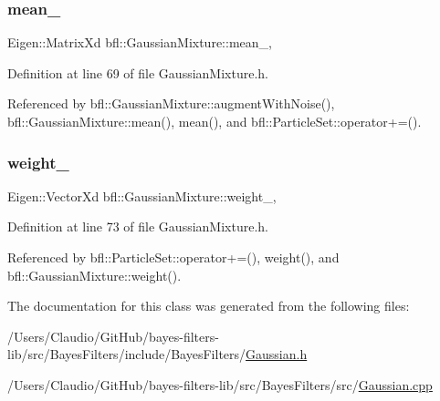 \subsubsection{\texorpdfstring{mean\+\_\+}{mean\_}}
{\footnotesize\ttfamily Eigen\+::\+Matrix\+Xd bfl\+::\+Gaussian\+Mixture\+::mean\+\_\+\hspace{0.3cm}{\ttfamily [protected]}, {\ttfamily [inherited]}}



Definition at line 69 of file Gaussian\+Mixture.\+h.



Referenced by bfl\+::\+Gaussian\+Mixture\+::augment\+With\+Noise(), bfl\+::\+Gaussian\+Mixture\+::mean(), mean(), and bfl\+::\+Particle\+Set\+::operator+=().

\mbox{\label{classbfl_1_1GaussianMixture_ac9ce000575d6b29ad8e1a756d750faff}} 
\subsubsection{\texorpdfstring{weight\+\_\+}{weight\_}}
{\footnotesize\ttfamily Eigen\+::\+Vector\+Xd bfl\+::\+Gaussian\+Mixture\+::weight\+\_\+\hspace{0.3cm}{\ttfamily [protected]}, {\ttfamily [inherited]}}



Definition at line 73 of file Gaussian\+Mixture.\+h.



Referenced by bfl\+::\+Particle\+Set\+::operator+=(), weight(), and bfl\+::\+Gaussian\+Mixture\+::weight().



The documentation for this class was generated from the following files\+:\begin{DoxyCompactItemize}
\item 
/\+Users/\+Claudio/\+Git\+Hub/bayes-\/filters-\/lib/src/\+Bayes\+Filters/include/\+Bayes\+Filters/\mbox{\hyperlink{Gaussian_8h}{Gaussian.\+h}}\item 
/\+Users/\+Claudio/\+Git\+Hub/bayes-\/filters-\/lib/src/\+Bayes\+Filters/src/\mbox{\hyperlink{Gaussian_8cpp}{Gaussian.\+cpp}}\end{DoxyCompactItemize}

